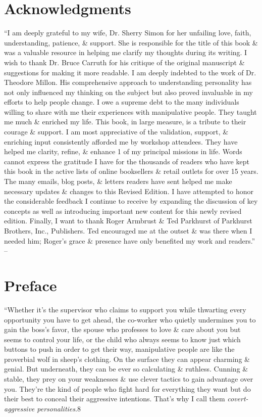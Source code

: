 \documentclass{article}
\numberwithin{equation}{section}
\begin{document}
\section{Acknowledgments}
``I am deeply grateful to my wife, Dr. Sherry Simon for her unfailing love, faith, understanding, patience, \& support. She is responsible for the title of this book \& was a valuable resource in helping me clarify my thoughts during its writing. I wish to thank Dr. Bruce Carruth for his critique of the original manuscript \& suggestions for making it more readable. I am deeply indebted to the work of Dr. Theodore Millon. His comprehensive approach to understanding personality has not only influenced my thinking on the subject but also proved invaluable in my efforts to help people change. I owe a supreme debt to the many individuals willing to share with me their experiences with manipulative people. They taught me much \& enriched my life. This book, in large measure, is a tribute to their courage \& support. I am most appreciative of the validation, support, \& enriching input consistently afforded me by workshop attendees. They have helped me clarity, refine, \& enhance 1 of my principal missions in life. Words cannot express the gratitude I have for the thousands of readers who have kept this book in the active lists of online booksellers \& retail outlets for over 15 years. The many emails, blog posts, \& letters readers have sent helped me make necessary updates \& changes to this Revised Edition. I have attempted to honor the considerable feedback I continue to receive by expanding the discussion of key concepts as well as introducing important new content for this newly revised edition. Finally, I want to thank Roger Armbrust \& Ted Parkhurst of Parkhurst Brothers, Inc., Publishers. Ted encouraged me at the outset \& was there when I needed him; Roger's grace \& presence have only benefited my work and readers.'' -- \cite[p. 7]{Simon2010}


\section*{Preface}
``Whether it's the supervisor who claims to support you while thwarting every opportunity you have to get ahead, the co-worker who quietly undermines you to gain the boss's favor, the spouse who professes to love \& care about you but seems to control your life, or the child who always seems to know just which buttons to push in order to get their way, manipulative people are like the proverbial wolf in sheep's clothing. On the surface they can appear charming \& genial. But underneath, they can be ever so calculating \& ruthless. Cunning \& stable, they prey on your weaknesses \& use clever tactics to gain advantage over you. They're the kind of people who fight hard for everything they want but do their best to conceal their aggressive intentions. That's why I call them \textit{covert-aggressive personalities}.8
\end{document}

